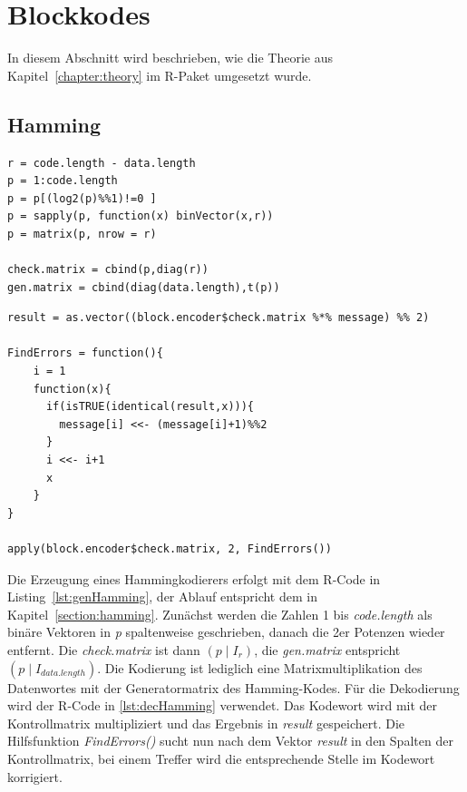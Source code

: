 \section{Blockkodes}
\label{section:impl_block}
In diesem Abschnitt wird beschrieben, wie die Theorie aus Kapitel~\ref{chapter:theory} im R-Paket umgesetzt wurde.

\subsection{Hamming}

\begin{lstlisting}[caption=Erzeugung der Generator- und Kontrollmatrix, label={lst:genHamming}, float=ht]
r = code.length - data.length
p = 1:code.length
p = p[(log2(p)%%1)!=0 ]
p = sapply(p, function(x) binVector(x,r))
p = matrix(p, nrow = r)

check.matrix = cbind(p,diag(r))
gen.matrix = cbind(diag(data.length),t(p))
\end{lstlisting}

\begin{lstlisting}[caption=Dekodierung eines Hamming-Kodes, label={lst:decHamming}, float=ht]
result = as.vector((block.encoder$check.matrix %*% message) %% 2)

FindErrors = function(){
    i = 1
    function(x){
      if(isTRUE(identical(result,x))){
      	message[i] <<- (message[i]+1)%%2
      }
      i <<- i+1
      x
    }
}

apply(block.encoder$check.matrix, 2, FindErrors())

\end{lstlisting}

Die Erzeugung eines Hammingkodierers erfolgt mit dem R-Code in Listing~\ref{lst:genHamming}, der Ablauf entspricht dem in Kapitel~\ref{section:hamming}. Zunächst werden die Zahlen 1 bis \emph{code.length} als binäre Vektoren in \emph{p} spaltenweise geschrieben, danach die 2er Potenzen wieder entfernt. Die \emph{check.matrix} ist dann $(p \mid I_r)$, die \emph{gen.matrix} entspricht $(p \mid I_{data.length})$.
\newblock
Die Kodierung ist lediglich eine Matrixmultiplikation des Datenwortes mit der Generatormatrix des Hamming-Kodes. Für die Dekodierung wird der R-Code in \ref{lst:decHamming} verwendet. Das Kodewort wird mit der Kontrollmatrix multipliziert und das Ergebnis in \emph{result} gespeichert. Die Hilfsfunktion \emph{FindErrors()} sucht nun nach dem Vektor \emph{result} in den Spalten der Kontrollmatrix, bei einem Treffer wird die entsprechende Stelle im Kodewort korrigiert.




